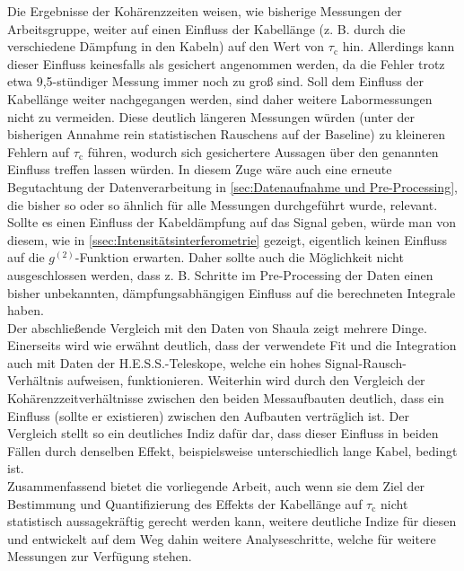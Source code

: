 Die Ergebnisse der Kohärenzzeiten weisen, wie bisherige Messungen der Arbeitsgruppe, weiter auf einen Einfluss der Kabellänge (z. B. durch die verschiedene Dämpfung in den Kabeln) auf den Wert von $\tau_\mathrm{c}$ hin. 
Allerdings kann dieser Einfluss keinesfalls als gesichert angenommen werden, da die Fehler trotz etwa 9{,}5-stündiger Messung immer noch zu groß sind. 
Soll dem Einfluss der Kabellänge weiter nachgegangen werden, sind daher weitere Labormessungen nicht zu vermeiden. 
Diese deutlich längeren Messungen würden (unter der bisherigen Annahme rein statistischen Rauschens auf der Baseline) zu kleineren Fehlern auf $\tau_\mathrm{c}$ führen, wodurch sich gesichertere Aussagen über den genannten Einfluss treffen lassen würden. 
In diesem Zuge wäre auch eine erneute Begutachtung der Datenverarbeitung in \autoref{sec:Datenaufnahme und Pre-Processing}, die bisher so oder so ähnlich für alle Messungen durchgeführt wurde, relevant. 
Sollte es einen Einfluss der Kabeldämpfung auf das Signal geben, würde man von diesem, wie in \autoref{ssec:Intensitätsinterferometrie} gezeigt, eigentlich keinen Einfluss auf die $g^{(2)}$-Funktion erwarten. 
Daher sollte auch die Möglichkeit nicht ausgeschlossen werden, dass z. B. Schritte im Pre-Processing der Daten einen bisher unbekannten, dämpfungsabhängigen Einfluss auf die berechneten Integrale haben. \\
Der abschließende Vergleich mit den Daten von Shaula zeigt mehrere Dinge. 
Einerseits wird wie erwähnt deutlich, dass der verwendete Fit und die Integration auch mit Daten der H.E.S.S.-Teleskope, welche ein hohes Signal-Rausch-Verhältnis aufweisen, funktionieren. 
Weiterhin wird durch den Vergleich der Kohärenzzeitverhältnisse zwischen den beiden Messaufbauten deutlich, dass ein Einfluss (sollte er existieren) zwischen den Aufbauten verträglich ist. 
Der Vergleich stellt so ein deutliches Indiz dafür dar, dass dieser Einfluss in beiden Fällen durch denselben Effekt, beispielsweise unterschiedlich lange Kabel, bedingt ist. \\

Zusammenfassend bietet die vorliegende Arbeit, auch wenn sie dem Ziel der Bestimmung und Quantifizierung des Effekts der Kabellänge auf $\tau_\mathrm{c}$ nicht statistisch aussagekräftig gerecht werden kann, weitere deutliche Indize für diesen und entwickelt auf dem Weg dahin weitere Analyseschritte, welche für weitere Messungen zur Verfügung stehen. 


